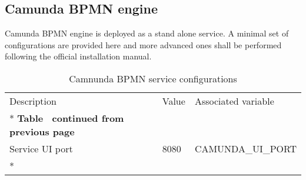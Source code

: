 	\subsection{Camunda BPMN engine}

	Camunda BPMN engine is deployed as a stand alone service.  A minimal set of configurations are provided here and more advanced ones shall be performed following the official installation manual. 
	
 	\begin{longtable}[c]{@{}p{4cm}p{2cm}l@{}}
	 	\toprule
	 	Description & Value & Associated variable \\* \midrule
	 	\endfirsthead
	 	\multicolumn{3}{c}%
	 	{{\bfseries Table \thetable\ continued from previous page}} \\
	 	\endhead
	 	\bottomrule
	 	\endfoot
	 	\endlastfoot
	 	Service UI port & 8080 & CAMUNDA\_UI\_PORT \\* \bottomrule
	 	\caption{Camnunda BPMN service configurations}
	 	\label{tab:my-table9}\\
	 \end{longtable}
	
	